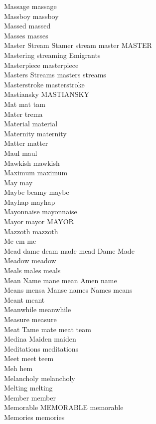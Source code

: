 Massage massage\\
Massboy massboy\\
Massed massed\\
Masses masses\\
Master Stream Stamer stream master MASTER\\
Mastering streaming Emigrants\\
Masterpiece masterpiece\\
Masters Streams masters streams\\
Masterstroke masterstroke\\
Mastiansky MASTIANSKY\\
Mat mat tam\\
Mater trema\\
Material material\\
Maternity maternity\\
Matter matter\\
Maul maul\\
Mawkish mawkish\\
Maximum maximum\\
May may\\
Maybe beamy maybe\\
Mayhap mayhap\\
Mayonnaise mayonnaise\\
Mayor mayor MAYOR\\
Mazzoth mazzoth\\
Me em me\\
Mead dame deam made mead Dame Made\\
Meadow meadow\\
Meals males meals\\
Mean Name mane mean Amen name\\
Means mensa Manse names Names means\\
Meant meant\\
Meanwhile meanwhile\\
Measure measure\\
Meat Tame mate meat team\\
Medina Maiden maiden\\
Meditations meditations\\
Meet meet teem\\
Meh hem\\
Melancholy melancholy\\
Melting melting\\
Member member\\
Memorable MEMORABLE memorable\\
Memories memories\\
